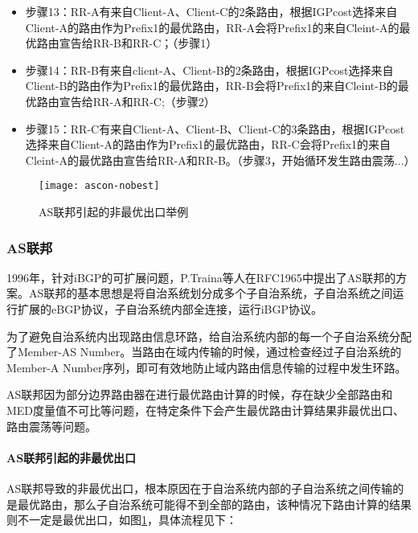 \begin{itemize}
\item 步骤13：RR-A有来自Client-A、Client-C的2条路由，根据IGPcost选择来自Client-A的路由作为Prefix1的最优路由，RR-A会将Prefix1的来自Cleint-A的最优路由宣告给RR-B和RR-C；（步骤1）
\item 步骤14：RR-B有来自client-A、Client-B的2条路由，根据IGPcost选择来自Client-B的路由作为Prefix1的最优路由，RR-B会将Prefix1的来自Cleint-B的最优路由宣告给RR-A和RR-C;（步骤2）
\item 步骤15：RR-C有来自Client-A、Client-B、Client-C的3条路由，根据IGPcost选择来自Client-A的路由作为Prefix1的最优路由，RR-C会将Prefix1的来自Cleint-A的最优路由宣告给RR-A和RR-B。（步骤3，开始循环发生路由震荡...）

\end{itemize}

\begin{figure}
  \centering
  \texttt{[image: ascon-nobest]}
  \caption{AS联邦引起的非最优出口举例\cite{rfc5065}}
  \label{fig:ascon-nobest}
\end{figure}


\subsubsection{AS联邦\cite{rfc1965}}


1996年，针对iBGP的可扩展问题，P.Traina等人在RFC1965\cite{rfc1965}中提出了AS联邦的方案。AS联邦的基本思想是将自治系统划分成多个子自治系统，子自治系统之间运行扩展的eBGP协议，子自治系统内部全连接，运行iBGP协议。

为了避免自治系统内出现路由信息环路，给自治系统内部的每一个子自治系统分配了Member-AS Number。当路由在域内传输的时候，通过检查经过子自治系统的Member-A Number序列，即可有效地防止域内路由信息传输的过程中发生环路。






AS联邦因为部分边界路由器在进行最优路由计算的时候，存在缺少全部路由和MED度量值不可比等问题，在特定条件下会产生最优路由计算结果非最优出口、路由震荡等问题。\\

\paragraph{AS联邦引起的非最优出口}

AS联邦导致的非最优出口\cite{rfc5065}，根本原因在于自治系统内部的子自治系统之间传输的是最优路由，那么子自治系统可能得不到全部的路由，该种情况下路由计算的结果则不一定是最优出口，如图\ref{fig:ascon-nobest}，具体流程见下：

